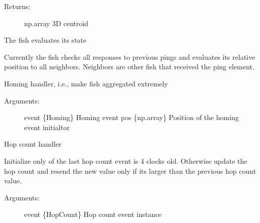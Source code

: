 \documentclass[letterpaper,10pt,english]{sphinxmanual}
\begin{document}
\begin{fulllineitems}
\begin{fulllineitems}
\begin{description}
\begin{description}
\end{description}

\item[{Returns:}] \leavevmode
np.array \textendash{} 3D centroid

\end{description}

\end{fulllineitems}


\begin{fulllineitems}
\label{\detokenize{index:fish.Fish.eval}}
The fish evaluates its state

Currently the fish checks all responses to previous pings and evaluates
its relative position to all neighbors. Neighbors are other fish that
received the ping element.

\end{fulllineitems}


\begin{fulllineitems}
\label{\detokenize{index:fish.Fish.homing_handler}}
Homing handler, i.e., make fish aggregated extremely
\begin{description}
\item[{Arguments:}] \leavevmode
event \{Homing\} \textendash{} Homing event
pos \{np.array\} \textendash{} Position of the homing event initialtor

\end{description}

\end{fulllineitems}


\begin{fulllineitems}
\label{\detokenize{index:fish.Fish.hop_count_handler}}
Hop count handler

Initialize only of the last hop count event is 4 clocks old. Otherwise
update the hop count and resend the new value only if its larger than
the previous hop count value.
\begin{description}
\item[{Arguments:}] \leavevmode
event \{HopCount\} \textendash{} Hop count event instance


\end{description}
\end{fulllineitems}
\end{fulllineitems}
\end{document}
